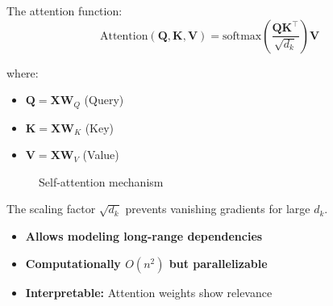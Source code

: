 The attention function:
\begin{equation}
\text{Attention}(\mathbf{Q}, \mathbf{K}, \mathbf{V}) = \text{softmax}\left(\frac{\mathbf{Q}\mathbf{K}^\top}{\sqrt{d_k}}\right)\mathbf{V}
\end{equation}

where:
\begin{itemize}
    \item $\mathbf{Q} = \mathbf{X}\mathbf{W}_Q$ (Query)
    \item $\mathbf{K} = \mathbf{X}\mathbf{W}_K$ (Key)
    \item $\mathbf{V} = \mathbf{X}\mathbf{W}_V$ (Value)
\end{itemize}

\begin{figure}[h]
    \centering
    \caption{Self-attention mechanism}
    \label{fig:self_attention}
\end{figure}

The scaling factor $\sqrt{d_k}$ prevents vanishing gradients for large $d_k$.

\begin{properties}
\begin{itemize}
    \item \textbf{Allows modeling long-range dependencies}
    \item \textbf{Computationally $O(n^2)$ but parallelizable}
    \item \textbf{Interpretable:} Attention weights show relevance
\end{itemize}
\end{properties}


